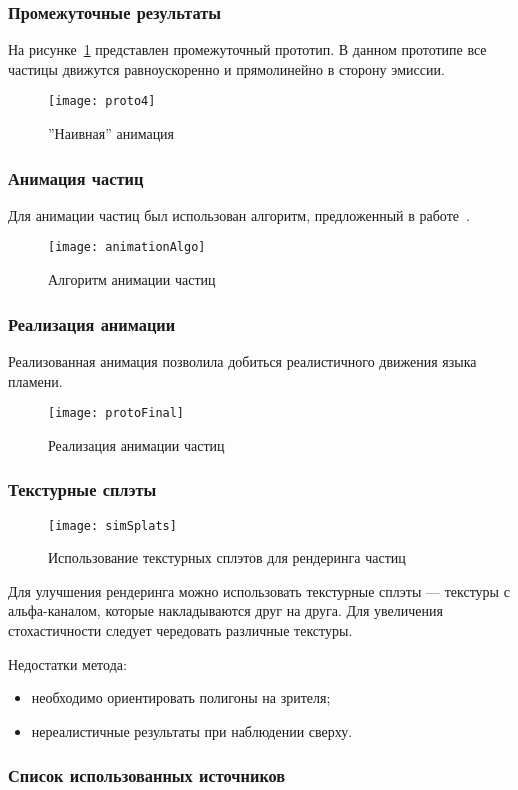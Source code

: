 \begin{frame}
\frametitle{Промежуточные результаты}
На рисунке~\ref{fig:proto4} представлен промежуточный прототип. В данном
прототипе все частицы движутся равноускоренно и прямолинейно в сторону эмиссии.
\begin{figure}[htb]
	\centering
    \texttt{[image: proto4]}
    \caption{''Наивная'' анимация}%
    \label{fig:proto4}
\end{figure}
\end{frame}

\begin{frame}
\frametitle{Анимация частиц}
Для анимации частиц был использован алгоритм, предложенный
в работе~\cite{Somasekaran2005UsingPS}.
\begin{figure}[htb]
	\centering
    \texttt{[image: animationAlgo]}
    \caption{Алгоритм анимации частиц}%
    \label{fig:animationAlgo}
\end{figure}
\end{frame}

\begin{frame}
\frametitle{Реализация анимации}
Реализованная анимация позволила добиться реалистичного движения языка пламени.
\begin{figure}[htb]
	\centering
    \texttt{[image: protoFinal]}
    \caption{Реализация анимации частиц}%
    \label{fig:protoFinal}
\end{figure}
\end{frame}

\begin{frame}[t]
\frametitle{Текстурные сплэты}
\begin{wrapfigure}{r}{0.3\textwidth}
	\centering
    \texttt{[image: simSplats]}
    \caption{Использование текстурных сплэтов для рендеринга частиц}%
    \label{fig:protoFinal}
\end{wrapfigure}
Для улучшения рендеринга можно использовать текстурные сплэты --- текстуры с
альфа-каналом, которые накладываются друг на друга. Для увеличения
стохастичности следует чередовать различные текстуры.

Недостатки метода:
\begin{itemize}
    \item необходимо ориентировать полигоны на зрителя;
    \item нереалистичные результаты при наблюдении сверху.
\end{itemize}
\end{frame}

\begin{frame}
\frametitle{Список использованных источников}
\sloppy\printbibliography[
    notcategory=AuthorSources,
    heading=none,
    resetnumbers,
]
\end{frame}

